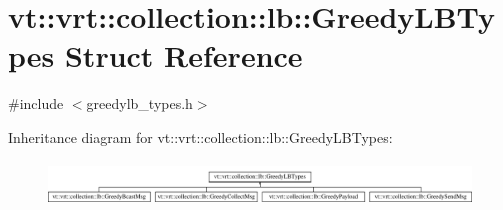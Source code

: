 \hypertarget{structvt_1_1vrt_1_1collection_1_1lb_1_1_greedy_l_b_types}{}\section{vt\+:\+:vrt\+:\+:collection\+:\+:lb\+:\+:Greedy\+L\+B\+Types Struct Reference}
\label{structvt_1_1vrt_1_1collection_1_1lb_1_1_greedy_l_b_types}


{\ttfamily \#include $<$greedylb\+\_\+types.\+h$>$}

Inheritance diagram for vt\+:\+:vrt\+:\+:collection\+:\+:lb\+:\+:Greedy\+L\+B\+Types\+:\begin{figure}[H]
\begin{center}
\leavevmode
\includegraphics[height=1.176471cm]{structvt_1_1vrt_1_1collection_1_1lb_1_1_greedy_l_b_types}
\end{center}
\end{figure}
